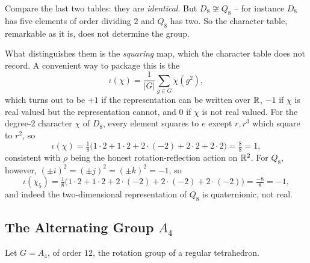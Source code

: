 \documentclass[a4paper]{scrartcl}
\begin{document}
\begin{remark}
	Compare the last two tables: they are \emph{identical}. But $D_8 \not\cong Q_8$ -- for instance $D_8$ has five elements of order dividing $2$ and $Q_8$ has two. So the character table, remarkable as it is, does not determine the group.

	What distinguishes them is the \emph{squaring} map, which the character table does not record. A convenient way to package this is the 
	$$\iota(\chi) = \frac1{|G|}\sum_{g\in G}\chi(g^2),$$
	which turns out to be $+1$ if the representation can be written over $\mathbb{R}$, $-1$ if $\chi$ is real valued but the representation cannot, and $0$ if $\chi$ is not real valued. For the degree-$2$ character $\chi$ of $D_8$, every element squares to $e$ except $r, r^3$ which square to $r^2$, so
	$$\iota(\chi) = \tfrac18\big(1\cdot 2 + 1\cdot 2 + 2\cdot(-2) + 2\cdot 2 + 2\cdot 2\big) = \tfrac88 = 1,$$
	consistent with $\rho$ being the honest rotation-reflection action on $\mathbb{R}^2$. For $Q_8$, however, $(\pm i)^2 = (\pm j)^2 = (\pm k)^2 = -1$, so
	$$\iota(\chi_5) = \tfrac18\big(1\cdot 2 + 1\cdot 2 + 2\cdot(-2) + 2\cdot(-2) + 2\cdot(-2)\big) = \tfrac{-8}{8} = -1,$$
	and indeed the two-dimensional representation of $Q_8$ is quaternionic, not real.
\end{remark}

\subsection{The Alternating Group \texorpdfstring{$A_4$}{A4}}

Let $G = A_4$, of order $12$, the rotation group of a regular tetrahedron.

\begin{center}
\end{center}
\end{document}
